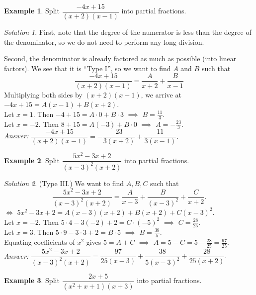 \documentclass[
  12pt,
  oneside]{book}
\theoremstyle{definition}
\theoremstyle{definition}
\newtheorem{example}{Example}[chapter]
\theoremstyle{definition}
\theoremstyle{definition}
\theoremstyle{remark}
\newtheorem*{solution}{Solution}
\begin{document}
\begin{example}
Split \(\dfrac{-4x+15}{(x+2)(x-1)}\) into partial fractions.
\end{example}

\begin{solution}
First, note that the degree of the numerator is less than the degree of the denominator, so we do not need to perform any long division.

Second, the denominator is already factored as much as possible (into linear factors). We see that it is ``Type I'', so we want to find \(A\) and \(B\) such that
\[
\frac{-4x+15}{(x+2)(x-1)} = \frac{A}{x+2}+\frac{B}{x-1}
\]
Multiplying both sides by \((x+2)(x-1)\), we arrive at\\
\(-4x+15 = A(x-1)+B(x+2)\).\\
Let \(x=1\). Then \(-4+15 = A\cdot 0+B\cdot 3\) \(\implies\) \(B=\frac{11}{3}\).\\
Let \(x=-2\). Then \(8+15=A(-3)+B\cdot 0\) \(\implies\) \(A=-\frac{23}{3}\).\\
\emph{Answer:}
\(\dfrac{-4x+15}{(x+2)(x-1)} = -\dfrac{23}{3(x+2)}+\dfrac{11}{3(x-1)}.\)
\end{solution}

\begin{example}
Split \(\dfrac{5x^2-3x+2}{(x-3)^2(x+2)}\) into partial fractions.
\end{example}

\begin{solution}
(Type III.) We want to find \(A,B,C\) such that
\[
\frac{5x^2-3x+2}{(x-3)^2(x+2)}=\frac{A}{x-3}+\frac{B}{(x-3)^2}+\frac{C}{x+2}.
\]
\(\iff\) \(5x^2-3x+2 = A(x-3)(x+2)+B(x+2)+C(x-3)^2\).\\
Let \(x=-2\). Then \(5\cdot 4-3(-2)+2 = C\cdot(-5)^2\) \(\implies\) \(C=\frac{28}{25}\).\\
Let \(x=3\). Then \(5\cdot 9-3\cdot 3+2 = B\cdot 5\) \(\implies\) \(B=\frac{38}{5}\).\\
Equating coefficients of \(x^2\) gives \(5=A+C\) \(\implies\) \(A=5-C=5-\frac{28}{25}=\frac{97}{25}\).\\
\emph{Answer:}
\(\dfrac{5x^2-3x+2}{(x-3)^2(x+2)}=\dfrac{97}{25(x-3)}+\dfrac{38}{5(x-3)^2}+\dfrac{28}{25(x+2)}.\)
\end{solution}

\begin{example}
Split \(\dfrac{2x+5}{(x^2+x+1)(x+3)}\) into partial fractions.
\end{example}
\end{document}
